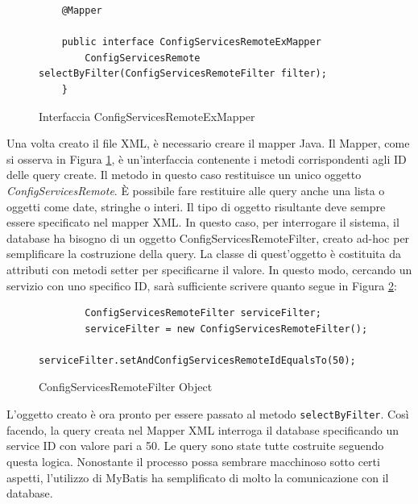 \begin{figure}[H]
    \begin{verbatim}
    @Mapper

    public interface ConfigServicesRemoteExMapper 
        ConfigServicesRemote selectByFilter(ConfigServicesRemoteFilter filter);
    }    
    \end{verbatim}
    \caption{Interfaccia ConfigServicesRemoteExMapper}
    \label{fig:mybatismapperinterface}
\end{figure}
Una volta creato il file XML, è necessario creare il mapper Java. Il Mapper, come si osserva in Figura \ref{fig:mybatismapperinterface}, è un'interfaccia contenente i metodi corrispondenti agli ID delle query create. Il metodo in questo caso restituisce un unico oggetto \textit{ConfigServicesRemote}. È possibile fare restituire alle query anche una lista o oggetti come date, stringhe o interi. Il tipo di oggetto risultante deve sempre essere specificato nel mapper XML. In questo caso, per interrogare il sistema, il database ha bisogno di un oggetto ConfigServicesRemoteFilter, creato ad-hoc per semplificare la costruzione della query. La classe di quest'oggetto è costituita da attributi con metodi setter per specificarne il valore. In questo modo, cercando un servizio con uno specifico ID, sarà sufficiente scrivere quanto segue in Figura \ref{fig:filterobject}:

\begin{figure}
    \begin{verbatim}
        ConfigServicesRemoteFilter serviceFilter; 
        serviceFilter = new ConfigServicesRemoteFilter();
        serviceFilter.setAndConfigServicesRemoteIdEqualsTo(50);
    \end{verbatim}
    \caption{ConfigServicesRemoteFilter Object}
    \label{fig:filterobject}
\end{figure}

L'oggetto creato è ora pronto per essere passato al metodo \texttt{selectByFilter}. Così facendo, la query creata nel Mapper XML interroga il database specificando un service ID con valore pari a 50. Le query sono state tutte costruite seguendo questa logica. Nonostante il processo possa sembrare macchinoso sotto certi aspetti, l'utilizzo di MyBatis ha semplificato di molto la comunicazione con il database.

